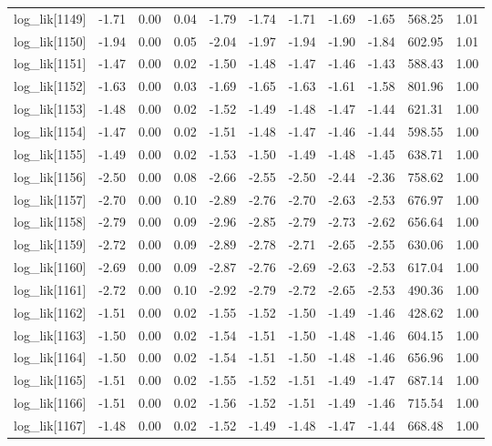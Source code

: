 \begin{table}[ht]
\begin{tabular}{rrrrrrrrrrr}
  log\_lik[1149] & -1.71 & 0.00 & 0.04 & -1.79 & -1.74 & -1.71 & -1.69 & -1.65 & 568.25 & 1.01 \\ 
  log\_lik[1150] & -1.94 & 0.00 & 0.05 & -2.04 & -1.97 & -1.94 & -1.90 & -1.84 & 602.95 & 1.01 \\ 
  log\_lik[1151] & -1.47 & 0.00 & 0.02 & -1.50 & -1.48 & -1.47 & -1.46 & -1.43 & 588.43 & 1.00 \\ 
  log\_lik[1152] & -1.63 & 0.00 & 0.03 & -1.69 & -1.65 & -1.63 & -1.61 & -1.58 & 801.96 & 1.00 \\ 
  log\_lik[1153] & -1.48 & 0.00 & 0.02 & -1.52 & -1.49 & -1.48 & -1.47 & -1.44 & 621.31 & 1.00 \\ 
  log\_lik[1154] & -1.47 & 0.00 & 0.02 & -1.51 & -1.48 & -1.47 & -1.46 & -1.44 & 598.55 & 1.00 \\ 
  log\_lik[1155] & -1.49 & 0.00 & 0.02 & -1.53 & -1.50 & -1.49 & -1.48 & -1.45 & 638.71 & 1.00 \\ 
  log\_lik[1156] & -2.50 & 0.00 & 0.08 & -2.66 & -2.55 & -2.50 & -2.44 & -2.36 & 758.62 & 1.00 \\ 
  log\_lik[1157] & -2.70 & 0.00 & 0.10 & -2.89 & -2.76 & -2.70 & -2.63 & -2.53 & 676.97 & 1.00 \\ 
  log\_lik[1158] & -2.79 & 0.00 & 0.09 & -2.96 & -2.85 & -2.79 & -2.73 & -2.62 & 656.64 & 1.00 \\ 
  log\_lik[1159] & -2.72 & 0.00 & 0.09 & -2.89 & -2.78 & -2.71 & -2.65 & -2.55 & 630.06 & 1.00 \\ 
  log\_lik[1160] & -2.69 & 0.00 & 0.09 & -2.87 & -2.76 & -2.69 & -2.63 & -2.53 & 617.04 & 1.00 \\ 
  log\_lik[1161] & -2.72 & 0.00 & 0.10 & -2.92 & -2.79 & -2.72 & -2.65 & -2.53 & 490.36 & 1.00 \\ 
  log\_lik[1162] & -1.51 & 0.00 & 0.02 & -1.55 & -1.52 & -1.50 & -1.49 & -1.46 & 428.62 & 1.00 \\ 
  log\_lik[1163] & -1.50 & 0.00 & 0.02 & -1.54 & -1.51 & -1.50 & -1.48 & -1.46 & 604.15 & 1.00 \\ 
  log\_lik[1164] & -1.50 & 0.00 & 0.02 & -1.54 & -1.51 & -1.50 & -1.48 & -1.46 & 656.96 & 1.00 \\ 
  log\_lik[1165] & -1.51 & 0.00 & 0.02 & -1.55 & -1.52 & -1.51 & -1.49 & -1.47 & 687.14 & 1.00 \\ 
  log\_lik[1166] & -1.51 & 0.00 & 0.02 & -1.56 & -1.52 & -1.51 & -1.49 & -1.46 & 715.54 & 1.00 \\ 
  log\_lik[1167] & -1.48 & 0.00 & 0.02 & -1.52 & -1.49 & -1.48 & -1.47 & -1.44 & 668.48 & 1.00 \\ 

\end{tabular}
\end{table}
